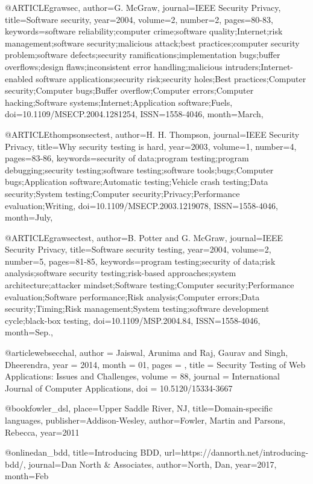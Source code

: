 @ARTICLE{grawsec,
author={G. {McGraw}},
journal={IEEE Security Privacy},
title={Software security},
year={2004},
volume={2},
number={2},
pages={80-83},
keywords={software reliability;computer crime;software quality;Internet;risk management;software security;malicious attack;best practices;computer security problem;software defects;security ramifications;implementation bugs;buffer overflows;design flaws;inconsistent error handling;malicious intruders;Internet-enabled software applications;security risk;security holes;Best practices;Computer security;Computer bugs;Buffer overflow;Computer errors;Computer hacking;Software systems;Internet;Application software;Fuels},
doi={10.1109/MSECP.2004.1281254},
ISSN={1558-4046},
month={March},}

@ARTICLE{thompsonsectest,
author={H. H. {Thompson}},
journal={IEEE Security Privacy},
title={Why security testing is hard},
year={2003},
volume={1},
number={4},
pages={83-86},
keywords={security of data;program testing;program debugging;security testing;software testing;software tools;bugs;Computer bugs;Application software;Automatic testing;Vehicle crash testing;Data security;System testing;Computer security;Privacy;Performance evaluation;Writing},
doi={10.1109/MSECP.2003.1219078},
ISSN={1558-4046},
month={July},}

@ARTICLE{grawsectest,
author={B. {Potter} and G. {McGraw}},
journal={IEEE Security Privacy},
title={Software security testing},
year={2004},
volume={2},
number={5},
pages={81-85},
keywords={program testing;security of data;risk analysis;software security testing;risk-based approaches;system architecture;attacker mindset;Software testing;Computer security;Performance evaluation;Software performance;Risk analysis;Computer errors;Data security;Timing;Risk management;System testing;software development cycle;black-box testing},
doi={10.1109/MSP.2004.84},
ISSN={1558-4046},
month={Sep.},}

@article{websecchal,
author = {Jaiswal, Arunima and Raj, Gaurav and Singh, Dheerendra},
year = {2014},
month = {01},
pages = {},
title = {Security Testing of Web Applications: Issues and Challenges},
volume = {88},
journal = {International Journal of Computer Applications},
doi = {10.5120/15334-3667}
}

@book{fowler_dsl,
place={Upper Saddle River, NJ},
title={Domain-specific languages},
publisher={Addison-Wesley},
author={Fowler, Martin and Parsons, Rebecca},
year={2011}}

@online{dan_bdd, title={Introducing BDD}, url={https://dannorth.net/introducing-bdd/}, journal={Dan North & Associates}, author={North, Dan}, year={2017}, month={Feb}}

